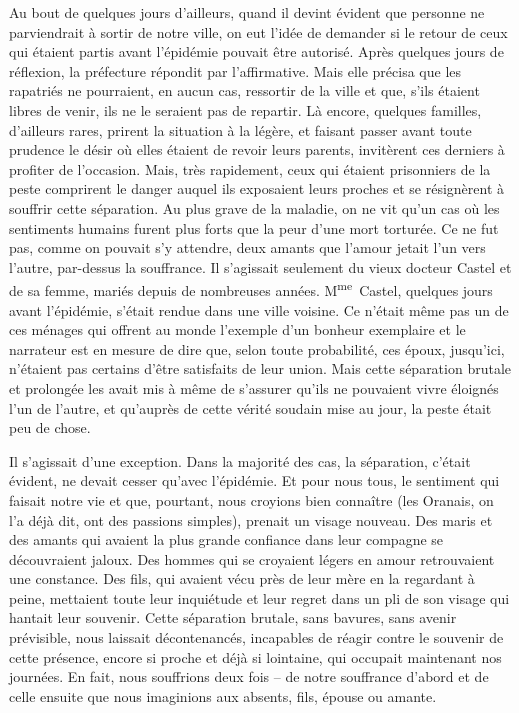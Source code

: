 \documentclass[french,twoside]{book} %
\begin{document}
Au bout de quelques jours d’ailleurs, quand il devint évident que personne ne parviendrait à sortir de notre ville, on eut l’idée de demander si le retour de ceux qui étaient partis avant l’épidémie pouvait être autorisé. Après quelques jours de réflexion, la préfecture répondit par l’affirmative. Mais elle précisa que les rapatriés ne pourraient, en aucun cas, ressortir de la ville et que, s’ils étaient libres de venir, ils ne le seraient pas de repartir. Là encore, quelques familles, d’ailleurs rares, prirent la situation à la légère, et faisant passer avant toute prudence le désir où elles étaient de revoir leurs parents, invitèrent ces derniers à profiter de l’occasion. Mais, très rapidement, ceux qui étaient prisonniers de la peste comprirent le danger auquel ils exposaient leurs proches et se résignèrent à souffrir cette séparation. Au plus grave de la maladie, on ne vit qu’un cas où les sentiments humains furent plus forts que la peur d’une mort torturée. Ce ne fut pas, comme on pouvait s’y attendre, deux amants que l’amour jetait l’un vers l’autre, par-dessus la souffrance. Il s’agissait seulement du vieux docteur Castel et de sa femme, mariés depuis de nombreuses années. M\textsuperscript{me} Castel, quelques jours avant l’épidémie, s’était rendue dans une ville voisine. Ce n’était même pas un de ces ménages qui offrent au monde l’exemple d’un bonheur exemplaire et le narrateur est en mesure de dire que, selon toute probabilité, ces époux, jusqu’ici, n’étaient pas certains d’être satisfaits de leur union. Mais cette séparation brutale et prolongée les avait mis à même de s’assurer qu’ils ne pouvaient vivre éloignés l’un de l’autre, et qu’auprès de cette vérité soudain mise au jour, la peste était peu de chose.\par
Il s’agissait d’une exception. Dans la majorité des cas, la séparation, c’était évident, ne devait cesser qu’avec l’épidémie. Et pour nous tous, le sentiment qui faisait notre vie et que, pourtant, nous croyions bien connaître (les Oranais, on l’a déjà dit, ont des passions simples), prenait un visage nouveau. Des maris et des amants qui avaient la plus grande confiance dans leur compagne se découvraient jaloux. Des hommes qui se croyaient légers en amour retrouvaient une constance. Des fils, qui avaient vécu près de leur mère en la regardant à peine, mettaient toute leur inquiétude et leur regret dans un pli de son visage qui hantait leur souvenir. Cette séparation brutale, sans bavures, sans avenir prévisible, nous laissait décontenancés, incapables de réagir contre le souvenir de cette présence, encore si proche et déjà si lointaine, qui occupait maintenant nos journées. En fait, nous souffrions deux fois – de notre souffrance d’abord et de celle ensuite que nous imaginions aux absents, fils, épouse ou amante.\par
\end{document}
